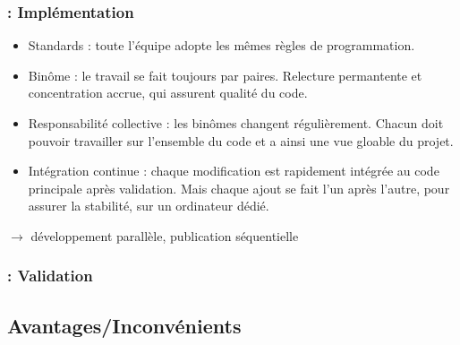 \begin{frame}
\frametitle{\insertsubsection : Implémentation}
\begin{itemize}
\item Standards : toute l'équipe adopte les mêmes règles de programmation.
\item Binôme : le travail se fait toujours par paires. Relecture permantente et concentration accrue, qui assurent qualité du code.
\item Responsabilité collective : les binômes changent régulièrement. Chacun doit pouvoir travailler sur l'ensemble du code et a ainsi une vue gloable du projet.
\item Intégration continue : chaque modification est rapidement intégrée au code principale après validation. Mais chaque ajout se fait l'un après l'autre, pour assurer la stabilité, sur un ordinateur dédié.
\end{itemize}

\begin{center}
$\longrightarrow$  développement parallèle, publication séquentielle 
\end{center}
\end{frame}

\begin{frame}
\frametitle{\insertsubsection : Validation}

\end{frame}

\subsection{Avantages/Inconvénients}
\begin{frame}
\frametitle{\insertsubsection}
\end{frame}
